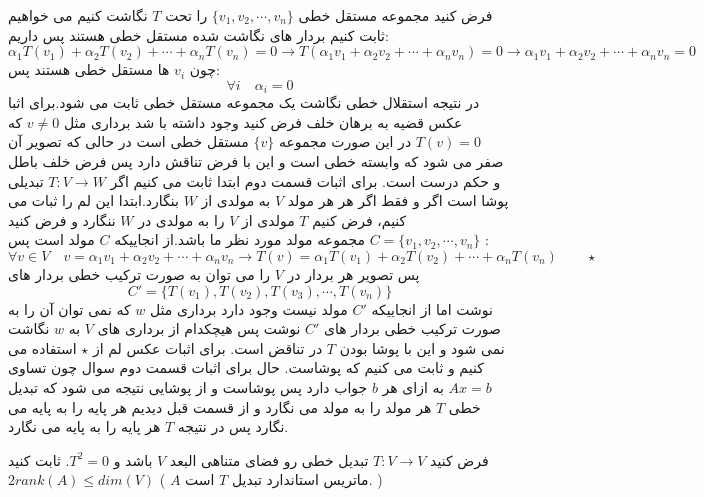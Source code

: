 \documentclass{article}
\begin{document}
   \begin{حل}
   	فرض کنید مجموعه مستقل خطی 
   	$\{v_1,v_2,\cdots,v_n\}$
   	را تحت 
   	$T$
   	نگاشت کنیم می خواهیم ثابت کنیم بردار های نگاشت شده مستقل خطی هستند پس داریم:
   	$$\alpha_1T(v_1)+\alpha_2T(v_2)+\cdots+\alpha_nT(v_n)=0\longrightarrow T(\alpha_1v_1+\alpha_2v_2+\cdots+\alpha_nv_n)=0\longrightarrow \alpha_1v_1+\alpha_2v_2+\cdots+\alpha_nv_n=0  $$
   	چون 
   	$v_i$
   	ها مستقل خطی هستند پس:
   	$$\forall i\quad\alpha_i=0$$
در نتیجه استقلال خطی نگاشت یک مجموعه مستقل خطی ثابت می شود.برای اثبا عکس قضیه  به برهان خلف فرض کنید وجود داشته با شد برداری مثل 
$v\neq0$
که 
$T(v)=0$
در این صورت مجموعه 
$\{v\}$
مستقل خطی است در حالی که تصویر آن صفر می شود که وابسته خطی است و این با فرض تناقش دارد پس فرض خلف باطل و حکم درست است.
برای اثبات قسمت دوم ابتدا ثابت می کنیم اگر 
$T:V\longrightarrow W$
تبدیلی پوشا است اگر و فقط اگر هر هر مولد 
$V$
به مولدی از 
$W$
بنگارد.ابتدا این لم را ثبات می کنیم، فرض کنیم 
$T$
مولدی از 
$V$
را به مولدی در 
$W$
ننگارد و فرض کنید 
$C=\{v_1,v_2,\cdots,v_n\}$
مجموعه مولد مورد نظر ما باشد.از انجاییکه 
$C$
مولد است پس :
$$\forall v\in V \quad v=\alpha_1v_1+\alpha_2v_2+\cdots+\alpha_nv_n\longrightarrow T(v)=\alpha_1T(v_1)+\alpha_2T(v_2)+\cdots+\alpha_nT(v_n)\qquad \star$$
پس تصویر هر بردار در 
$V$
را می توان به صورت ترکیب خطی بردار های 
$$C'=\{T(v_1),T(v_2),T(v_3),\cdots,T(v_n)\}$$ 
نوشت اما از انجاییکه 
$C'$
مولد نیست وجود دارد برداری مثل 
$w$
که نمی توان آن را به صورت ترکیب خطی بردار های 
$C'$
نوشت پس هیچکدام از برداری های 
$V$
به 
$w$
نگاشت نمی شود و این با پوشا بودن 
$T$
در تناقض است. برای اثبات عکس لم از 
$\star$
استفاده می کنیم و ثابت می کنیم که پوشاست. حال برای اثبات قسمت دوم سوال چون تساوی 
$Ax=b$
به ازای هر 
$b$
جواب دارد پس پوشاست و از پوشایی نتیجه می شود که تبدیل خطی 
$T$
هر مولد را به مولد می نگارد و از قسمت قبل دیدیم هر پایه را به پایه می نگارد پس در نتیجه 
$T$
هر پایه را به پایه می نگارد.
   	
   	
   	\end{حل}
   
    فرض کنید 
   $T:V\longrightarrow V$
   تبدیل خطی رو فضای متناهی البعد 
   $V$
   باشد و 
   $T^2=0$.
   ثابت کنید 
   \\
$2rank(A)\leq dim(V)$
   (
   $A$
   ماتریس استاندارد تبدیل 
   $T$
   است.
   )
   
\end{document}
